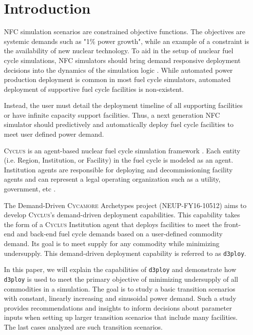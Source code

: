 \documentclass[11pt,letterpaper]{article}
\newcommand{\Cyclus}{\textsc{Cyclus}\xspace}%
\newcommand{\Cycamore}{\textsc{Cycamore}\xspace}%
\newcommand{\deploy}{\texttt{d3ploy}\xspace}%
\begin{document}
\section{Introduction}
\gls{NFC} simulation scenarios are constrained objective functions. 
The objectives are systemic demands such as "1\% power growth", 
while an example of a constraint is the availability of new nuclear 
technology. 
To aid in the setup of nuclear fuel cycle simulations, \gls{NFC}
simulators should bring demand responsive deployment decisions into 
the dynamics of the simulation logic \cite{huff_current_2017}. 
While automated power production deployment is common in most fuel 
cycle simulators, automated deployment of supportive fuel cycle 
facilities is non-existent. 

Instead, the user must detail the deployment timeline of all 
supporting facilities or have infinite capacity support facilities. 
Thus, a next generation \gls{NFC} simulator should predictively and 
automatically deploy fuel cycle facilities to meet user defined 
power demand. 

\Cyclus is an agent-based nuclear fuel cycle simulation framework 
\cite{huff_fundamental_2016}. 
Each entity (i.e. Region, Institution, or Facility) in the fuel 
cycle is modeled as an agent. 
Institution agents
are responsible for deploying and decommissioning facility agents 
and can represent a legal operating organization such as a 
utility, government, etc \cite{huff_fundamental_2016}. 

The Demand-Driven \Cycamore Archetypes project (NEUP-FY16-10512)
aims to develop \Cyclus's demand-driven deployment capabilities. 
This capability takes the form of a \Cyclus Institution
agent that deploys facilities to meet the front-end and back-end 
fuel cycle demands based on a user-defined commodity demand. 
Its goal is to meet supply for any commodity while minimizing 
undersupply.
This demand-driven deployment capability is referred to as 
\deploy. 

In this paper, we will explain the capabilities of \deploy and 
demonstrate how \deploy is used to meet the primary objective
of minimizing undersupply of all commodities in a simulation.
The goal is to study a basic transition scenarios with constant,
linearly increasing and sinusoidal power demand. Such a study
provides recommendations and insights to inform 
decisions about parameter inputs when setting up 
larger transition scenarios that include many facilities.
The last cases analyzed are such transition scenarios.
\end{document}
